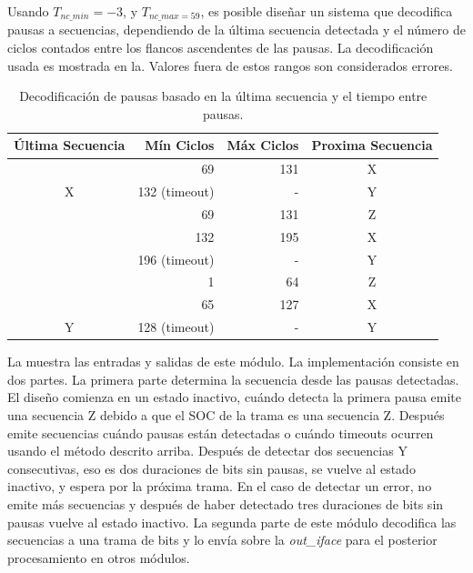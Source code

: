 \documentclass[a4paper, twoside, 11pt]{report}
\begin{document}
Usando $T_{nc\_min} = -3$, y $T_{nc\_max = 59}$, es posible diseñar un sistema que decodifica pausas a secuencias, dependiendo de la última secuencia detectada y el número de ciclos contados entre los flancos ascendentes de las pausas. La decodificación usada es mostrada en la. Valores fuera de estos rangos son considerados errores.

\begin{table}[htb]
  \centering
  \begin{tabular}{c|r|r|c}
    \rowcolor{lightgray!35}
    \textbf{Última Secuencia} & \textbf{Mín Ciclos} & \textbf{Máx Ciclos} & \textbf{Proxima Secuencia} \\
    \hline
                        & 69             & 131   & X \\
    \multirow{-2}{*}{X} & 132 (timeout)  & -     & Y \\
    \rowcolor{lightgray!35}
                        & 69             & 131   & Z \\
    \rowcolor{lightgray!35}
                        & 132            & 195   & X \\
    \rowcolor{lightgray!35}
    \multirow{-3}{*}{Z} & 196 (timeout)  & -     & Y \\
                        & 1              & 64    & Z \\
                        & 65             & 127   & X \\
    \multirow{-3}{*}{Y} & 128 (timeout)  & -     & Y \\
  \end{tabular}
  \caption{Decodificación de pausas basado en la última secuencia y el tiempo entre pausas.}
  \label{tab:sequence_decode_timings}
\end{table}

La  muestra las entradas y salidas de este módulo. La implementación consiste en dos partes. La primera parte determina la secuencia desde las pausas detectadas. El diseño comienza en un estado inactivo, cuándo detecta la primera pausa emite una secuencia Z debido a que el SOC de la trama es una secuencia Z. Después emite secuencias cuándo pausas están detectadas o cuándo timeouts ocurren usando el método descrito arriba. Después de detectar dos secuencias Y consecutivas, eso es dos duraciones de bits sin pausas, se vuelve al estado inactivo, y espera por la próxima trama. En el caso de detectar un error, no emite más secuencias y después de haber detectado tres duraciones de bits sin pausas vuelve al estado inactivo. La segunda parte de este módulo decodifica las secuencias a una trama de bits y lo envía sobre la \textit{out\_iface} para el posterior procesamiento en otros módulos.
\end{document}
